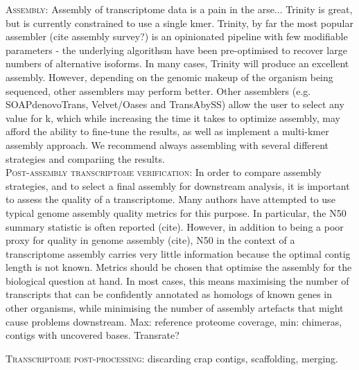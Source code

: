 \textsc{Assembly}: Assembly of transcriptome data is a pain in the arse... Trinity is great, but is currently constrained to use a single kmer. Trinity, by far the most popular assembler (cite assembly survey?) is an opinionated pipeline with few modifiable parameters - the underlying algorithsm have been pre-optimised to recover large numbers of alternative isoforms. In many cases, Trinity will produce an excellent assembly. However, depending on the genomic makeup of the organism being sequenced, other assemblers may perform better. Other assemblers (e.g. SOAPdenovoTrans, Velvet/Oases and TransAbySS) allow the user to select any value for k, which while increasing the time it takes to optimize assembly, may afford the ability to fine-tune the results, as well as implement a multi-kmer assembly approach. We recommend always assembling with several different strategies and compariing the results. \\

\textsc{Post-assembly transcriptome verification}: In order to compare assembly strategies, and to select a final assembly for downstream analysis, it is important to assess the quality of a transcriptome. Many authors have attempted to use typical genome assembly quality metrics for this purpose. In particular, the N50 summary statistic is often reported (cite). However, in addition to being a poor proxy for quality in genome assembly (cite), N50 in the context of a transcriptome assembly carries very little information because the optimal contig length is not known. Metrics should be chosen that optimise the assembly for the biological question at hand. In most cases, this means maximising the number of transcripts that can be confidently annotated as homologs of known genes in other organisms, while minimising the number of assembly artefacts that might cause problems downstream. Max: reference proteome coverage, min: chimeras, contigs with uncovered bases. Transrate?

\textsc{Transcriptome post-processing}: discarding crap contigs, scaffolding, merging.